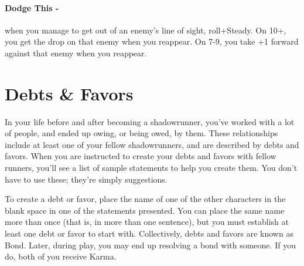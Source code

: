 \paragraph{Dodge This -} when you manage to get out of an enemy’s line of sight, roll+Steady. On 10+, you get the drop on that enemy when you reappear. On 7-9, you take +1 forward against that enemy when you reappear.


\clearpage
\section{Debts \& Favors}

In your life before and after becoming a shadowrunner, you’ve worked with a lot of people, and ended up owing, or being owed, by them. These relationships include at least one of your fellow shadowrunners, and are described by debts and favors. When you are instructed to create your debts and favors with fellow runners, you’ll see a list of sample statements to help you create them. You don’t have to use these; they’re simply suggestions.
    
To create a debt or favor, place the name of one of the other characters in the blank space in one of the statements presented. You can place the same name more than once (that is, in more than one sentence), but you must establish at least one debt or favor to start with. Collectively, debts and favors are known as Bond. Later, during play, you may end up resolving a bond with someone. If you do, both of you receive Karma.